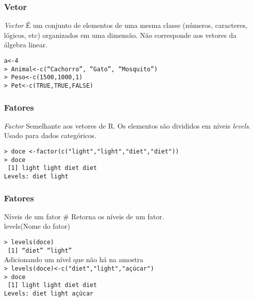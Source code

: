 \documentclass{beamer}
\begin{document}
  \begin{frame}
    \frametitle{Vetor}
    \begin{block}{\textit{Vector}}
     É um conjunto de elementos de uma mesma classe
      (números, caracteres, lógicos, etc) organizados em uma
      dimensão. Não corresponde aos vetores da álgebra linear.
    \end{block}
\vspace{10pt}
\texttt{a<-4\\
> Animal<-c(``Cachorro'', ``Gato'', ``Mosquito'')\\
> Peso<-c(1500,1000,1)\\
> Pet<-c(TRUE,TRUE,FALSE)\\}
  \end{frame}
  \begin{frame}
    \frametitle{Fatores}
    \begin{block}{\textit{Factor}}
     Semelhante aos vetores de R. Os elementos são divididos  em níveis  \textit{levels}. Usado para dados categóricos.      
    \end{block} 
\vspace{10pt}
\texttt{> doce <-factor(c("light","light","diet","diet")) \\
> doce \\
~[1] light light diet  diet \\
Levels: diet light}
  \end{frame}
  \begin{frame}
    \frametitle{Fatores}
    \begin{block}{Níveis de um fator}
        \# Retorna os níveis de um fator. \\
        levels(Nome do fator)
    \end{block}
\vspace{10pt}
\texttt{> levels(doce)\\
~[1] ``diet''   ``light''}\\
\vspace{10pt}
Adicionando um nível que não há na amostra \\ 
\texttt{> levels(doce)<-c("diet","light","açúcar")\\
> doce \\
~[1] light light diet  diet \\
Levels: diet light açúcar}
  \end{frame}
\end{document}
